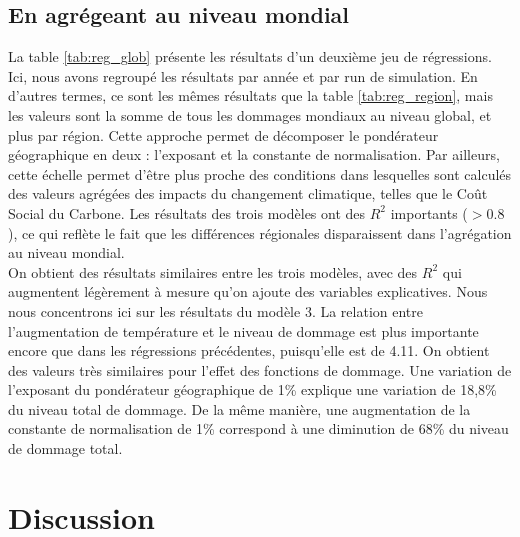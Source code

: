 \subsection{En agrégeant au niveau mondial}

\begin{table}
    \centering
    \resizebox{\textwidth}{!}{}
    \label{tab:reg_glob}
\end{table}

La table \ref{tab:reg_glob} présente les résultats d'un deuxième jeu de régressions. Ici, nous avons regroupé les résultats par année et par run de simulation. En d'autres termes, ce sont les mêmes résultats que la table \ref{tab:reg_region}, mais les valeurs sont la somme de tous les dommages mondiaux au niveau global, et plus par région. Cette approche permet de décomposer le pondérateur géographique en deux : l'exposant et la constante de normalisation. Par ailleurs, cette échelle permet d'être plus proche des conditions dans lesquelles sont calculés des valeurs agrégées des impacts du changement climatique, telles que le Coût Social du Carbone. Les résultats des trois modèles ont des $R^2$ importants ($>0.8$), ce qui reflète le fait que les différences régionales disparaissent dans l'agrégation au niveau mondial. \\

On obtient des résultats similaires entre les trois modèles, avec des $R^2$ qui augmentent légèrement à mesure qu'on ajoute des variables explicatives. Nous nous concentrons ici sur les résultats du modèle 3. La relation entre l'augmentation de température et le niveau de dommage est plus importante encore que dans les régressions précédentes, puisqu'elle est de 4.11. On obtient des valeurs très similaires pour l'effet des fonctions de dommage. Une variation de l'exposant du pondérateur géographique de 1\% explique une variation de 18,8\% du niveau total de dommage. De la même manière, une augmentation de la constante de normalisation de 1\% correspond à une diminution de 68\% du niveau de dommage total. 


\section{Discussion}







